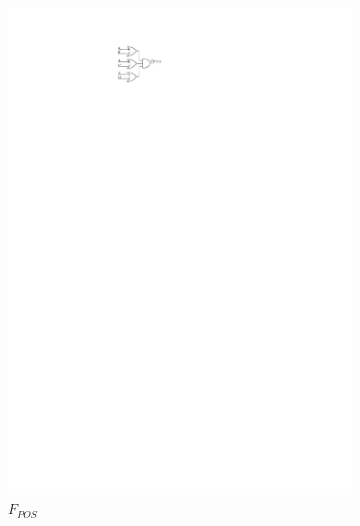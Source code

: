 \begin{figure}[h]
	\centering
	\begin{subfigure}[b]{0.3\textwidth}
		\centering
		\includegraphics[width=\textwidth]{fig/Q1_F_POS.pdf}
		\caption{$F_{POS}$}
		\label{fig:F_POS}
	\end{subfigure}
	\hfil
	\begin{subfigure}[b]{0.3\textwidth}
		\centering

\end{subfigure}
\end{figure}
